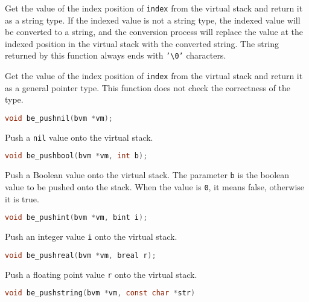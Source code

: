 
Get the value of the index position of \texttt{index} from the virtual stack and return it as a string type. If the indexed value is not a string type, the indexed value will be converted to a string, and the conversion process will replace the value at the indexed position in the virtual stack with the converted string. The string returned by this function always ends with \texttt{'\textbackslash 0'} characters.


Get the value of the index position of \texttt{index} from the virtual stack and return it as a general pointer type. This function does not check the correctness of the type.


\begin{lstlisting}[language=c, style=berry, numbers=none]
void be_pushnil(bvm *vm);
\end{lstlisting}

Push a \texttt{nil} value onto the virtual stack.


\begin{lstlisting}[language=c, style=berry, numbers=none]
void be_pushbool(bvm *vm, int b);
\end{lstlisting}

Push a Boolean value onto the virtual stack. The parameter \texttt{b} is the boolean value to be pushed onto the stack. When the value is \texttt{0}, it means false, otherwise it is true.


\begin{lstlisting}[language=c, style=berry, numbers=none]
void be_pushint(bvm *vm, bint i);
\end{lstlisting}

Push an integer value \texttt{i} onto the virtual stack.


\begin{lstlisting}[language=c, style=berry, numbers=none]
void be_pushreal(bvm *vm, breal r);
\end{lstlisting}

Push a floating point value \texttt{r} onto the virtual stack.


\begin{lstlisting}[language=c, style=berry, numbers=none]
void be_pushstring(bvm *vm, const char *str)
\end{lstlisting}


